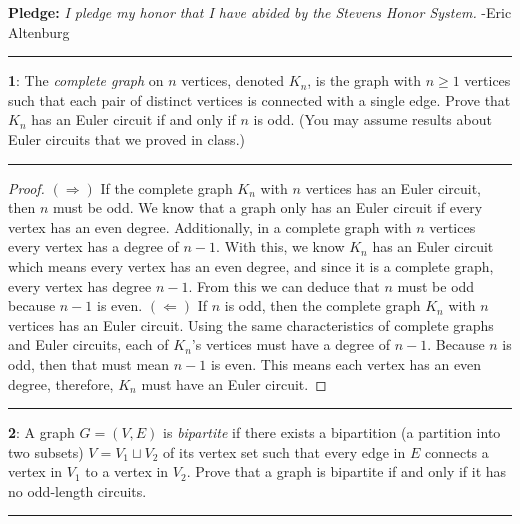 \documentclass[11pt]{article}
\newcommand\question[2]{\vspace{.25in}\hrule\textbf{#1}: #2\vspace{.5em}\hrule\vspace{.10in}}
\begin{document}
\raggedright
\newcommand\NAME{Eric Altenburg}  %
\newcommand\COURSE{MA-240}
\newcommand\HWNUM{9}              %


\textbf{Pledge:} \textit{I pledge my honor that I have abided by the Stevens Honor System.} -Eric Altenburg

\question{1}{The \textit{complete graph} on $n$ vertices, denoted $K_n$, is the graph with $ n \ge 1$ vertices such that each pair of distinct vertices is connected with a single edge. Prove that $K_n$ has an Euler circuit if and only if $n$ is odd. (You may assume results about Euler circuits that we proved in class.)}

\begin{proof}
	$(\Longrightarrow)$ If the complete graph $K_n$ with $n$ vertices has an Euler circuit, then $n$ must be odd. We know that a graph only has an Euler circuit if every vertex has an even degree. Additionally, in a complete graph with $n$ vertices every vertex has a degree of $n-1$. With this, we know $K_n$ has an Euler circuit which means every vertex has an even degree, and since it is a complete graph, every vertex has degree $n-1$. From this we can deduce that $n$ must be odd because $n-1$ is even.
	\newline
	$(\Longleftarrow)$ If $n$ is odd, then the complete graph $K_n$ with $n$ vertices has an Euler circuit. Using the same characteristics of complete graphs and Euler circuits, each of $K_n$'s vertices must have a degree of $n-1$. Because $n$ is odd, then that must mean $n-1$ is even. This means each vertex has an even degree, therefore, $K_n$ must have an Euler circuit.
\end{proof}

\question{2}{A graph $G=(V,E)$ is \textit{bipartite} if there exists a bipartition (a partition into two subsets) $V=V_1\sqcup V_2$ of its vertex set such that every edge in $E$ connects a vertex in $V_1$ to a vertex in $V_2$. Prove that a graph is bipartite if and only if it has no odd-length circuits.}
\end{document}
